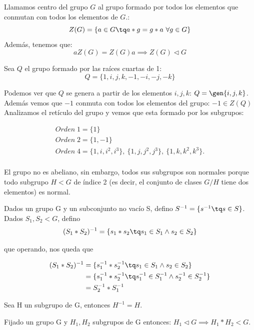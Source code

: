 \documentclass[nochap]{apuntes}
\begin{document}
\begin{defn}
	Llamamos centro del grupo $G$ al grupo formado por todos los elementos que conmutan con todos los elementos de $G$.:\\
	\[ Z(G) = \{ a\in G\tq a\ast g = g\ast a\ \forall g\in G\} \]
	Además, tenemos que:
	\[ aZ(G)=Z(G)a \implies Z(G)\lhd G \]
  \end{defn}  
  
  \begin{example}
	Sea $Q$ el grupo formado por las raíces cuartas de 1:
	\[ Q = \{ 1, i, j, k, -1, -i, -j, -k\} \] 
	
	Podemos ver que $Q$ se genera a partir de los elementos $i, j, k$: $Q = \gen{i,j,k}$.
	Además vemos que $-1$ conmuta con todos los elementos del grupo: $-1 \in Z(Q)$
	Analizamos el retículo del grupo y vemos que esta formado por los subgrupos:
	
	\begin{gather*}
	Orden\; 1 = \{ 1\}\\
	Orden\; 2 = \{ 1, -1\} \\
	Orden\; 4 = \{ 1, i, i^2, i^3\},\
			  \{ 1, j, j^2, j^3 \},\
			  \{ 1, k, k^2, k^3 \}.\\
			  \end{gather*}
			  
		  
	El grupo no es abeliano, sin embargo, todos sus subgrupos son normales porque todo subgrupo $H<G$ de índice 2 (es decir, el conjunto de clases $G/H$ tiene dos elementos) es normal.
	
  \end{example}
  
 
 Dados un grupo G y un subconjunto no vacío S, defino $S^{-1}=\{s^{-1}\tq s\in S\}$. Dados $S_{1},S_{2}<G$, defino  \[ (S_{1}\ast S_{2})^{-1}=\{s_{1}\ast s_{2}\tq s_{1}\in S_{1} \wedge s_{2}\in S_{2}\} \]
 
 que operando, nos queda que 
 
 \begin{align*}
 (S_1 \ast S_2)^{-1} &= \{s_{1}^{-1}\ast s_{2}^{-1}\tq s_{1}\in S_{1} \wedge s_{2}\in S_{2}\}\\
 &= \{s_{1}^{-1}\ast s_{2}^{-1}\tq s_{1}^{-1}\in S_{1}^{-1} \wedge s_{2}^{-1}\in S_{2}^{-1}\} \\
 & =S_{2}^{-1}\ast S_{1}^{-1}
 \end{align*}
 
 Sea H un subgrupo de G, entonces $H^{-1}=H$.
 
 \begin{theorem}
  Fijado un grupo G y $H_{1}, H_{2}$  subgrupos de G entonces: $H_{1} \lhd G \implies H_{1}\ast H_{2}<G$. 
 \end{theorem}
 
\end{document}
